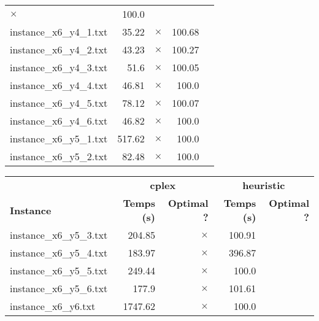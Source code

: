 \documentclass{article}
\begin{document}
\begin{center}
\begin{tabular}{lrrrr}
$\times$
 & 100.0 & 
\\
instance\_x6\_y4\_1.txt & 35.22 & 
$\times$
 & 100.68 & 
\\
instance\_x6\_y4\_2.txt & 43.23 & 
$\times$
 & 100.27 & 
\\
instance\_x6\_y4\_3.txt & 51.6 & 
$\times$
 & 100.05 & 
\\
instance\_x6\_y4\_4.txt & 46.81 & 
$\times$
 & 100.0 & 
\\
instance\_x6\_y4\_5.txt & 78.12 & 
$\times$
 & 100.07 & 
\\
instance\_x6\_y4\_6.txt & 46.82 & 
$\times$
 & 100.0 & 
\\
instance\_x6\_y5\_1.txt & 517.62 & 
$\times$
 & 100.0 & 
\\
instance\_x6\_y5\_2.txt & 82.48 & 
$\times$
 & 100.0 & 
\\
\hline\end{tabular}
\end{center}

\newpage
\begin{center}
\renewcommand{\arraystretch}{1.4} 
 \begin{tabular}{lrrrr}
	\hline
 & \multicolumn{2}{c}{\textbf{cplex}} & \multicolumn{2}{c}{\textbf{heuristic}}\\
\textbf{Instance}  & \textbf{Temps (s)} & \textbf{Optimal ?}  & \textbf{Temps (s)} & \textbf{Optimal ?} \\\hline

instance\_x6\_y5\_3.txt & 204.85 & 
$\times$
 & 100.91 & 
\\
instance\_x6\_y5\_4.txt & 183.97 & 
$\times$
 & 396.87 & 
\\
instance\_x6\_y5\_5.txt & 249.44 & 
$\times$
 & 100.0 & 
\\
instance\_x6\_y5\_6.txt & 177.9 & 
$\times$
 & 101.61 & 
\\
instance\_x6\_y6.txt & 1747.62 & 
$\times$
 & 100.0 & 
\\
\hline\end{tabular}
\end{center}
\end{document}
